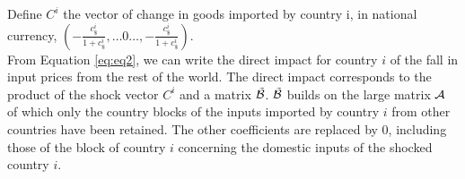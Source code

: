 \documentclass[11pt,a4paper]{article}
\begin{document}
%
%
%

Define $C^i$ the vector of change in goods imported by country i, in national currency, 
$\left(-\frac{c_\$^i}{1+c_\$^i},\ldots0\ldots,-\frac{c_\$^i}{1+c_\$^i} \right)$. \\

From Equation \ref{eq:eq2}, we can write the direct impact for country $i$ of the fall in input prices from the rest of the world. The direct impact corresponds to the product of the shock vector $C^i$  and a matrix ${\tilde{{\cal B}}}$. ${\tilde{{\cal B}}}$ builds on the large matrix ${\cal A}$ of which only the country blocks of the inputs imported by country $i$ from other countries have been retained. The other coefficients are replaced by 0, including those of the block of country $i$ concerning the domestic inputs of the shocked country $i$. \\
\end{document}
